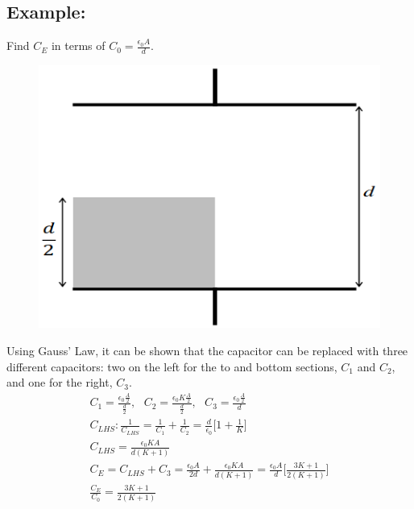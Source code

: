 \documentclass[a4paper, 11pt, fleqn, normalem]{report}
\begin{document}
\subsection{Example:}
Find $C_{E}$ in terms of $C_{0} = \frac{\epsilon_{0}A}{d}$.
\begin{figure}[H]
    \includegraphics[scale=0.5]{Cap2.png}
\end{figure}
Using Gauss' Law, it can be shown that the capacitor can be replaced with three different capacitors: two on the left for the to and bottom sections, $C_{1}$ and $C_{2}$, and one for the right, $C_{3}$.
\begin{gather*}
    C_{1} = \frac{\epsilon_{0}\tfrac{A}{2}}{\tfrac{d}{2}}, ~~~ C_{2} = \frac{\epsilon_{0}K\tfrac{A}{2}}{\tfrac{d}{2}}, ~~~ C_{3} = \frac{\epsilon_{0}\tfrac{A}{2}}{d} \\
    C_{LHS}: \frac{1}{C_{LHS}} = \frac{1}{C_{1}} + \frac{1}{C_{2}} = \frac{d}{\epsilon_{0}} \Big[1 + \frac{1}{K}\Big] \\
    C_{LHS} = \frac{\epsilon_{0}KA}{d(K + 1)} \\
    C_{E} = C_{LHS} + C_{3} = \frac{\epsilon_{0}A}{2d} + \frac{\epsilon_{0}KA}{d(K + 1)} = \frac{\epsilon_{0}A}{d}\Big[\frac{3K + 1}{2(K + 1)}\Big] \\
    \frac{C_{E}}{C_{0}} = \frac{3K + 1}{2(K + 1)}
\end{gather*}
\end{document}
